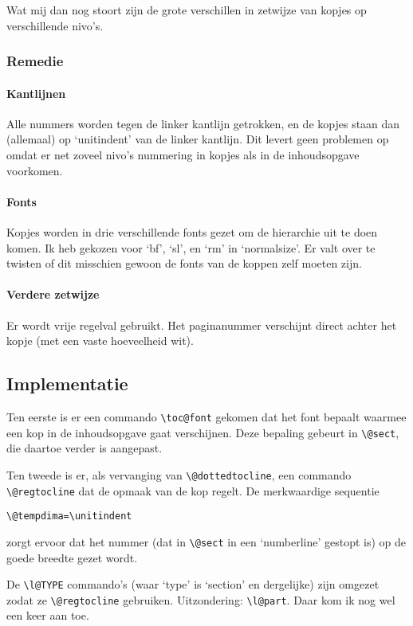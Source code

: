 \documentclass[a4paper]{artikel1} %
\begin{document}
Wat mij dan nog stoort zijn de grote verschillen in zetwijze
van kopjes op verschillende nivo's.
 
\subsubsection{Remedie}
 
\paragraph{Kantlijnen}
Alle nummers worden tegen de linker kantlijn getrokken, en de kopjes
staan dan (allemaal) op `unitindent' van de linker kantlijn. Dit
levert geen problemen op omdat er net zoveel nivo's nummering in
kopjes als in de inhoudsopgave voorkomen.
 
\paragraph{Fonts}
Kopjes worden in drie verschillende fonts gezet om de hierarchie uit
te doen komen. Ik heb gekozen voor `bf', `sl', en `rm' in
`normalsize'. Er valt over te twisten of dit misschien gewoon de fonts
van de koppen zelf moeten zijn.
 
\paragraph{Verdere zetwijze}
Er wordt vrije regelval gebruikt. Het paginanummer verschijnt direct
achter het kopje (met een vaste hoeveelheid wit).
 
\subsection{Implementatie}
 
Ten eerste is er een commando \verb+\toc@font+ gekomen dat het font
bepaalt waarmee een kop in de inhoudsopgave gaat verschijnen.  Deze
bepaling gebeurt in \verb+\@sect+, die daartoe verder is aangepast.
 
Ten tweede is er, als vervanging van \verb+\@dottedtocline+,
een commando\\ \verb+\@regtocline+ dat de opmaak van de kop regelt.
De merkwaardige sequentie
\begin{verbatim}
\@tempdima=\unitindent 
\end{verbatim}
zorgt ervoor dat het nummer (dat in \verb+\@sect+ in een `numberline'
gestopt is) op de goede breedte gezet wordt.
 
De \verb+\l@TYPE+ commando's (waar `type' is `section' en dergelijke)
zijn omgezet zodat ze \verb+\@regtocline+ gebruiken.  Uitzondering:
\verb+\l@part+. Daar kom ik nog wel een keer aan toe.
 
\end{document}
